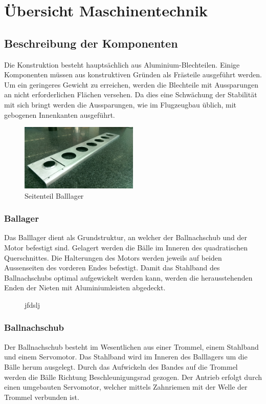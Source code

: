 \section{Übersicht Maschinentechnik}

\subsection{Beschreibung der Komponenten}

Die Konstruktion besteht hauptsächlich aus Aluminium-Blechteilen. Einige 
Komponenten müssen aus konstruktiven Gründen als Frästeile ausgeführt werden. 
Um ein geringeres Gewicht zu erreichen, werden die Blechteile mit Aussparungen 
an nicht erforderlichen Flächen versehen. Da dies eine Schwächung der 
Stabilität mit sich bringt werden die Aussparungen, wie im Flugzeugbau üblich, 
mit gebogenen Innenkanten ausgeführt.

\begin{figure}[h!]          
	\centering             
	\includegraphics[width=0.5\textwidth]{fig/IMAG0364.jpg}
	\caption{Seitenteil Balllager}
	\label{fig:Seitenteil Balllager}        
\end{figure}

\subsubsection{Ballager}
Das Balllager dient als Grundstruktur, an welcher der Ballnachschub und der 
Motor befestigt sind. Gelagert werden die Bälle im Inneren des quadratischen 
Querschnittes. Die Halterungen des Motors werden jeweils auf beiden 
Aussenseiten des vorderen Endes befestigt. Damit das Stahlband des 
Ballnachschubs optimal aufgewickelt werden kann, werden die herausstehenden 
Enden der Nieten mit Aluminiumleisten abgedeckt.

\begin{figure}[h!]          
	\centering             
	\caption{jfdslj}
	\label{fig:hhjfdhfd}        
\end{figure}

\subsubsection{Ballnachschub}
Der Ballnachschub besteht im Wesentlichen aus einer Trommel, einem Stahlband 
und einem Servomotor. Das Stahlband wird im Inneren des Balllagers um die 
Bälle herum ausgelegt. Durch das Aufwickeln des Bandes auf die Trommel werden 
die Bälle Richtung Beschleunigungsrad gezogen. Der Antrieb erfolgt durch einen 
umgebauten Servomotor, welcher mittels Zahnriemen mit der Welle der Trommel 
verbunden ist.

